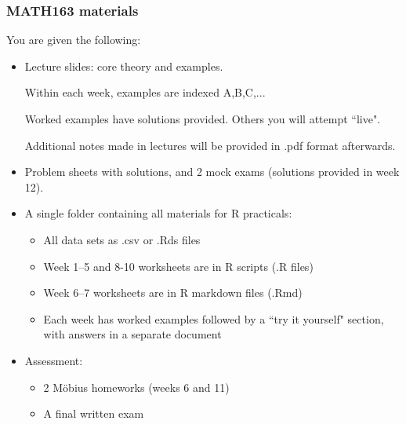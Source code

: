 \documentclass[t,8pt]{beamer}
\begin{document}
	
	\begin{frame}
		\frametitle{MATH163 materials}
		You are given the following:
		\begin{itemize}
			\item Lecture slides: core theory and examples. \par
			Within each week, examples are indexed A,B,C,... \par 
			Worked examples have solutions provided. Others you will attempt ``live". \par 
			Additional notes made in lectures will be provided in .pdf format afterwards. 
			\item Problem sheets with solutions, and 2 mock exams (solutions provided in week 12). 
			\item A single folder containing all materials for R practicals:
			\begin{itemize}
				\item[-] All data sets as .csv or .Rds files
				\item[-] Week 1–5 and 8-10 worksheets are in R scripts (.R files)
				\item[-] Week 6–7 worksheets are in R markdown files (.Rmd)
				\item Each week has worked examples followed by a ``try it yourself" section, with answers in a separate document
			\end{itemize}
			\item Assessment:
			\begin{itemize}
				\item[-] 2 M\"obius homeworks (weeks 6 and 11)
				\item[-] A final written exam
			\end{itemize}
		\end{itemize}
	\end{frame}
	
\end{document}
